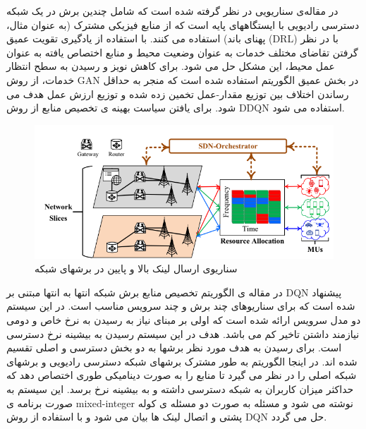 در مقاله‌ی
 \cite{gan1, gan2}
سناریویی در نظر گرفته شده است که شامل چندین برش در یک شبکه دسترسی رادیویی با ایستگاههای پایه است که از منابع فیزیکی مشترک (به عنوان مثال، پهنای باند) استفاده می کنند. 
با استفاده از یادگیری تقویت عمیق (DRL) با در نظر گرفتن تقاضای مختلف خدمات به عنوان وضعیت محیط و منابع اختصاص یافته به عنوان عمل محیط، این مشکل حل می شود.
برای کاهش نویز و رسیدن به سطح انتظار خدمات، از روش GAN در بخش عمیق الگوریتم استفاده شده است که منجر به حداقل رساندن اختلاف بین توزیع مقدار-عمل تخمین زده شده و توزیع ارزش عمل هدف
می شود.
برای یافتن سیاست بهینه ی تخصیص منابع از روش
DDQN 
 استفاده می شود.
\begin{figure}
  \centering
    \includegraphics[scale=0.7]{./fig/gan}
  \caption{سناریوی ارسال لینک بالا و پایین در برشهای شبکه }
  \label{fig:gan}
\end{figure} 
 
در مقاله ی
\cite{li2020end} 
الگوریتم تخصیص منابع برش شبکه انتها به انتها مبتنی بر 
DQN 
 پیشنهاد شده است که برای سناریوهای چند برش و چند سرویس مناسب است.
 در این سیستم دو مدل سرویس ارائه شده است که اولی بر مبنای نیاز به رسیدن به نرخ خاص و دومی نیازمند داشتن تاخیر کم می باشد.
هدف در این سیستم رسیدن به بیشینه نرخ دسترسی است.
برای رسیدن به هدف مورد نظر برشها به دو بخش دسترسی و اصلی تقسیم شده اند.
 در اینجا الگوریتم به طور مشترک برشهای شبکه دسترسی رادیویی و برشهای شبکه اصلی را در نظر می گیرد تا منابع را به صورت دینامیکی طوری اختصاص دهد که 
 حداکثر میزان کاربران به شبکه دسترسی داشته و به بیشینه نرخ برسد.
 این سیستم به صورت برنامه ی
 mixed-integer
 نوشته می شود
و مسئله به صورت دو مسئله ی کوله پشتی و اتصال لینک ها بیان می شود
  و با استفاده از روش
 DQN
 حل می گردد.
 